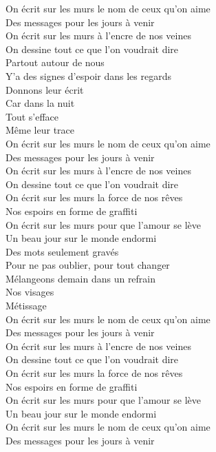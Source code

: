 \documentclass{novel}
\begin{document}
\begin{multicols}{2}
On écrit sur les murs le nom de ceux qu'on aime \\
Des messages pour les jours à venir \\
On écrit sur les murs à l'encre de nos veines \\
On dessine tout ce que l'on voudrait dire \\
Partout autour de nous \\
Y'a des signes d'espoir dans les regards \\
Donnons leur écrit \\
Car dans la nuit \\
Tout s'efface \\
Même leur trace \\
On écrit sur les murs le nom de ceux qu'on aime \\
Des messages pour les jours à venir \\
On écrit sur les murs à l'encre de nos veines \\
On dessine tout ce que l'on voudrait dire \\
On écrit sur les murs la force de nos rêves \\
Nos espoirs en forme de graffiti \\
On écrit sur les murs pour que l'amour se lève \\
Un beau jour sur le monde endormi \\
Des mots seulement gravés \\
Pour ne pas oublier, pour tout changer \\
Mélangeons demain dans un refrain \\
Nos visages \\
Métissage \\
On écrit sur les murs le nom de ceux qu'on aime \\
Des messages pour les jours à venir \\
On écrit sur les murs à l'encre de nos veines \\
On dessine tout ce que l'on voudrait dire \\
On écrit sur les murs la force de nos rêves \\
Nos espoirs en forme de graffiti \\
On écrit sur les murs pour que l'amour se lève \\
Un beau jour sur le monde endormi \\
On écrit sur les murs le nom de ceux qu'on aime \\
Des messages pour les jours à venir \\

\end{multicols}
\end{document}
